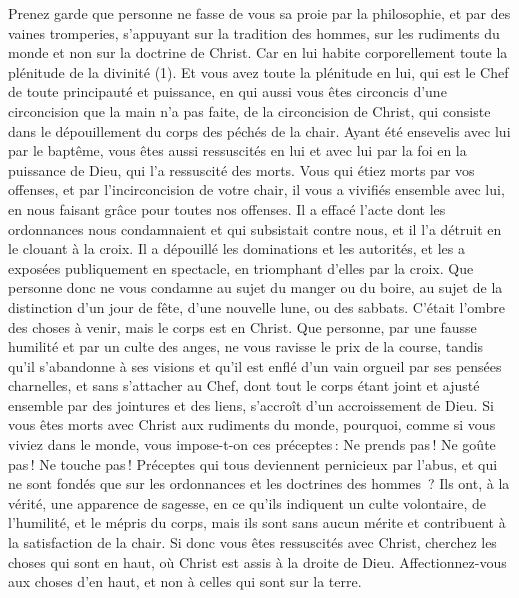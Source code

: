 \begin{multicols}{2}
Prenez garde que personne ne fasse de vous sa proie par la philosophie, et par des vaines tromperies, s’appuyant sur la tradition des hommes, sur les rudiments du monde et non sur la doctrine de Christ.
Car en lui habite corporellement toute la plénitude de la divinité (1).
Et vous avez toute la plénitude en lui, qui est le Chef de toute principauté et puissance,
en qui aussi vous êtes circoncis d'une circoncision que la main n’a pas faite, de la circoncision de Christ, qui consiste dans le dépouillement du corps des péchés de la chair.
Ayant été ensevelis avec lui par le baptême, vous êtes aussi ressuscités en lui et avec lui par la foi en la puissance de Dieu, qui l'a ressuscité des morts.
Vous qui étiez morts par vos offenses, et par l’incirconcision de votre chair, il vous a vivifiés ensemble avec lui, en nous faisant grâce pour toutes nos offenses.
Il a effacé l’acte dont les ordonnances nous condamnaient et qui subsistait contre nous, et il l’a détruit en le clouant à la croix.
Il a dépouillé les dominations et les autorités, et les a exposées publiquement en spectacle, en triomphant d’elles par la croix.
Que personne donc ne vous condamne au sujet du manger ou du boire, au sujet de la distinction d'un jour de fête, d’une nouvelle lune, ou des sabbats.
C’était l’ombre des choses à venir, mais le corps est en Christ.
Que personne, par une fausse humilité et par un culte des anges, ne vous ravisse le prix de la course, tandis qu’il s’abandonne à ses visions et qu’il est enflé d’un vain orgueil par ses pensées charnelles,
et sans s’attacher au Chef, dont tout le corps étant joint et ajusté ensemble par des jointures et des liens, s’accroît d'un accroissement de Dieu.
Si vous êtes morts avec Christ aux rudiments du monde, pourquoi, comme si vous viviez dans le monde, vous impose-t-on ces préceptes :
Ne prends pas ! Ne goûte pas ! Ne touche pas !
Préceptes qui tous deviennent pernicieux par l’abus, et qui ne sont fondés que sur les ordonnances et les doctrines des hommes ?
Ils ont, à la vérité, une apparence de sagesse, en ce qu’ils indiquent un culte volontaire, de l’humilité, et le mépris du corps, mais ils sont sans aucun mérite et contribuent à la satisfaction de la chair.
\VerseOne{}Si donc vous êtes ressuscités avec Christ, cherchez les choses qui sont en haut, où Christ est assis à la droite de Dieu.
Affectionnez-vous aux choses d’en haut, et non à celles qui sont sur la terre.

\end{multicols}
